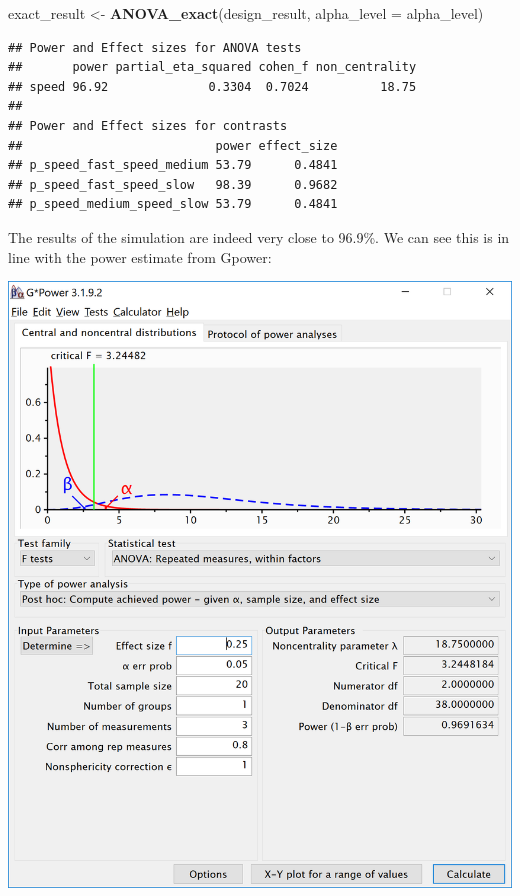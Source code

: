 \documentclass[]{book}
\newenvironment{Shaded}{\begin{snugshade}}{\end{snugshade}}
\newcommand{\DataTypeTok}[1]{\textcolor[rgb]{0.13,0.29,0.53}{#1}}
\newcommand{\KeywordTok}[1]{\textcolor[rgb]{0.13,0.29,0.53}{\textbf{#1}}}
\newcommand{\NormalTok}[1]{#1}
\newcommand{\StringTok}[1]{\textcolor[rgb]{0.31,0.60,0.02}{#1}}
\begin{document}
\begin{Shaded}
\begin{Highlighting}[]
\NormalTok{exact_result <-}\StringTok{ }\KeywordTok{ANOVA_exact}\NormalTok{(design_result, }\DataTypeTok{alpha_level =}\NormalTok{ alpha_level)}
\end{Highlighting}
\end{Shaded}

\begin{verbatim}
## Power and Effect sizes for ANOVA tests
##       power partial_eta_squared cohen_f non_centrality
## speed 96.92              0.3304  0.7024          18.75
## 
## Power and Effect sizes for contrasts
##                           power effect_size
## p_speed_fast_speed_medium 53.79      0.4841
## p_speed_fast_speed_slow   98.39      0.9682
## p_speed_medium_speed_slow 53.79      0.4841
\end{verbatim}

The results of the simulation are indeed very close to 96.9\%. We can see this is in line with the power estimate from Gpower:

\includegraphics{screenshots/gpower_12.png}
\end{document}
